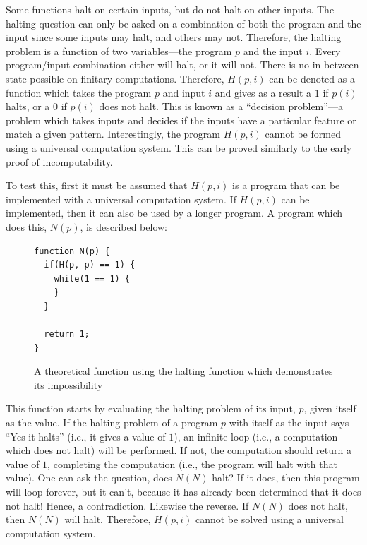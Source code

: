 Some functions halt on certain inputs, but do not halt on other inputs.  The halting question can only be asked on a combination of both the program and the input since some inputs may halt, and others may not.  Therefore, the halting problem is a function of two variables---the program $p$ and the input $i$.  Every program/input combination either will halt, or it will not.  There is no in-between state possible on finitary computations.  Therefore, $H(p, i)$ can be denoted as a function which takes the program $p$ and input $i$ and gives as a result a $1$ if $p(i)$ halts, or a $0$ if $p(i)$ does not halt.  This is known as a ``decision problem''---a problem which takes inputs and decides if the inputs have a particular feature or match a given pattern.  Interestingly, the program $H(p, i)$ cannot be formed using a universal computation system.  This can be proved similarly to the early proof of incomputability.  

To test this, first it must be assumed that $H(p, i)$ is a program that can be implemented with a universal computation system.  If $H(p, i)$ can be implemented, then it can also be used by a longer program.  A program which does this, $N(p)$, is described below:

\begin{figure}[H]
\begin{mdframed}
\begin{verbatim}
function N(p) {
  if(H(p, p) == 1) {
    while(1 == 1) {
    }
  }

  return 1;
}
\end{verbatim}
\end{mdframed}
\caption{A theoretical function using the halting function which demonstrates its impossibility}
\end{figure}

This function starts by evaluating the halting problem of its input, $p$, given itself as the value.  If the halting problem of a program $p$ with itself as the input says ``Yes it halts'' (i.e., it gives a value of $1$), an infinite loop (i.e., a computation which does not halt) will be performed.  If not, the computation should return a value of $1$, completing the computation (i.e., the program will halt with that value).  One can ask the question, does $N(N)$ halt?  If it does, then this program will loop forever, but it can't, because it has already been determined that it does not halt!  Hence, a contradiction.  Likewise the reverse.  If $N(N)$ does not halt, then $N(N)$ will halt. Therefore, $H(p, i)$ cannot be solved using a universal computation system.

